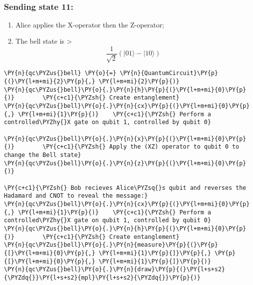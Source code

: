             
    
    \begin{center}
    \end{center}
    { \hspace*{\fill} \\}
    

    \hypertarget{sending-state-11}{%
\subsubsection*{Sending state 11:}\label{sending-state-11}}

\begin{enumerate}
\def\labelenumi{\arabic{enumi}.}
\tightlist
\item
  Alice applies the X-operator then the Z-operator;
\item
  The bell state is \textgreater{}
  \[\frac{1}{\sqrt{2}}(\lvert 01\rangle - \lvert 10\rangle)\]
\end{enumerate}

    \begin{tcolorbox}[breakable, size=fbox, boxrule=1pt, pad at break*=1mm,colback=cellbackground, colframe=cellborder]
\begin{Verbatim}[commandchars=\\\{\}]
\PY{n}{qc\PYZus{}bell} \PY{o}{=} \PY{n}{QuantumCircuit}\PY{p}{(}\PY{l+m+mi}{2}\PY{p}{,} \PY{l+m+mi}{2}\PY{p}{)}
\PY{n}{qc\PYZus{}bell}\PY{o}{.}\PY{n}{h}\PY{p}{(}\PY{l+m+mi}{0}\PY{p}{)}        \PY{c+c1}{\PYZsh{} Create entanglement}
\PY{n}{qc\PYZus{}bell}\PY{o}{.}\PY{n}{cx}\PY{p}{(}\PY{l+m+mi}{0}\PY{p}{,} \PY{l+m+mi}{1}\PY{p}{)}    \PY{c+c1}{\PYZsh{} Perform a controlled\PYZhy{}X gate on qubit 1, controlled by qubit 0}

\PY{n}{qc\PYZus{}bell}\PY{o}{.}\PY{n}{x}\PY{p}{(}\PY{l+m+mi}{0}\PY{p}{)}        \PY{c+c1}{\PYZsh{} Apply the (XZ) operator to qubit 0 to change the Bell state}
\PY{n}{qc\PYZus{}bell}\PY{o}{.}\PY{n}{z}\PY{p}{(}\PY{l+m+mi}{0}\PY{p}{)}

\PY{c+c1}{\PYZsh{} Bob recieves Alice\PYZsq{}s qubit and reverses the Hadamard and CNOT to reveal the message:}
\PY{n}{qc\PYZus{}bell}\PY{o}{.}\PY{n}{cx}\PY{p}{(}\PY{l+m+mi}{0}\PY{p}{,} \PY{l+m+mi}{1}\PY{p}{)}    \PY{c+c1}{\PYZsh{} Perform a controlled\PYZhy{}X gate on qubit 1, controlled by qubit 0}
\PY{n}{qc\PYZus{}bell}\PY{o}{.}\PY{n}{h}\PY{p}{(}\PY{l+m+mi}{0}\PY{p}{)}        \PY{c+c1}{\PYZsh{} Create entanglement}
\PY{n}{qc\PYZus{}bell}\PY{o}{.}\PY{n}{measure}\PY{p}{(}\PY{p}{[}\PY{l+m+mi}{0}\PY{p}{,} \PY{l+m+mi}{1}\PY{p}{]}\PY{p}{,} \PY{p}{[}\PY{l+m+mi}{0}\PY{p}{,} \PY{l+m+mi}{1}\PY{p}{]}\PY{p}{)}
\PY{n}{qc\PYZus{}bell}\PY{o}{.}\PY{n}{draw}\PY{p}{(}\PY{l+s+s2}{\PYZdq{}}\PY{l+s+s2}{mpl}\PY{l+s+s2}{\PYZdq{}}\PY{p}{)}
\end{Verbatim}
\end{tcolorbox}
 
